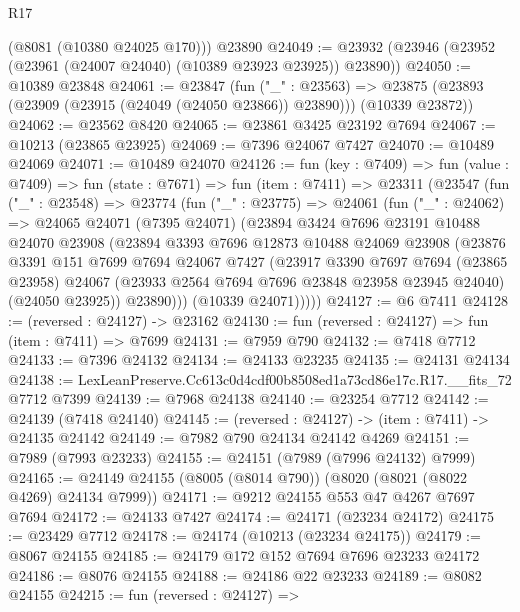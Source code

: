 \begin{lexlean}{R17}
\begin{coremodule}
      (@8081 (@10380 @24025 @170)))
    @23890
@24049 := @23932 (@23946 (@23952 (@23961 (@24007 @24040) (@10389 @23923 @23925)) @23890))
@24050 := @10389 @23848
@24061 := @23847
    (fun ("_" : @23563) =>
    @23875 (@23893 (@23909 (@23915 (@24049 (@24050 @23866)) @23890))) (@10339 @23872))
@24062 := @23562 @8420
@24065 := @23861 @3425 @23192 @7694
@24067 := @10213 (@23865 @23925)
@24069 := @7396 @24067 @7427
@24070 := @10489 @24069
@24071 := @10489 @24070
@24126 := fun (key : @7409) =>
  fun (value : @7409) =>
  fun (state : @7671) =>
  fun (item : @7411) =>
  @23311
    (@23547
      (fun ("_" : @23548) =>
      @23774
        (fun ("_" : @23775) =>
        @24061
          (fun ("_" : @24062) =>
          @24065
            @24071
            (@7395 @24071)
            (@23894
              @3424
              @7696
              @23191
              @10488
              @24070
              @23908
              (@23894
                @3393
                @7696
                @12873
                @10488
                @24069
                @23908
                (@23876
                  @3391
                  @151
                  @7699
                  @7694
                  @24067
                  @7427
                  (@23917
                    @3390
                    @7697
                    @7694
                    (@23865 @23958)
                    @24067
                    (@23933 @2564 @7694 @7696 @23848 @23958 @23945 @24040)
                    (@24050 @23925))
                  @23890)))
            (@10339 @24071)))))
@24127 := @6 @7411
@24128 := (reversed : @24127) -> @23162
@24130 := fun (reversed : @24127) => fun (item : @7411) => @7699
@24131 := @7959 @790
@24132 := @7418 @7712
@24133 := @7396 @24132
@24134 := @24133 @23235
@24135 := @24131 @24134
@24138 := LexLeanPreserve.Cc613c0d4cdf00b8508ed1a73cd86e17c.R17.__fits_72 @7712 @7399
@24139 := @7968 @24138
@24140 := @23254 @7712
@24142 := @24139 (@7418 @24140)
@24145 := (reversed : @24127) -> (item : @7411) -> @24135 @24142
@24149 := @7982 @790 @24134 @24142 @4269
@24151 := @7989 (@7993 @23233)
@24155 := @24151 (@7989 (@7996 @24132) @7999)
@24165 := @24149 @24155 (@8005 (@8014 @790)) (@8020 (@8021 (@8022 @4269) @24134 @7999))
@24171 := @9212 @24155 @553 @47 @4267 @7697 @7694
@24172 := @24133 @7427
@24174 := @24171 (@23234 @24172)
@24175 := @23429 @7712
@24178 := @24174 (@10213 (@23234 @24175))
@24179 := @8067 @24155
@24185 := @24179 @172 @152 @7694 @7696 @23233 @24172
@24186 := @8076 @24155
@24188 := @24186 @22 @23233
@24189 := @8082 @24155
@24215 := fun (reversed : @24127) =>

\end{coremodule}
\end{lexlean}
